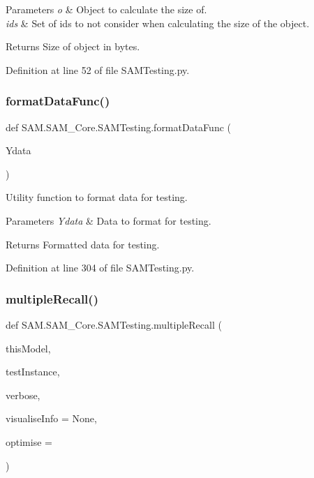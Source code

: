 \begin{DoxyParams}{Parameters}
{\em o} & Object to calculate the size of. \\
\hline
{\em ids} & Set of ids to not consider when calculating the size of the object.\\
\hline
\end{DoxyParams}
\begin{DoxyReturn}{Returns}
Size of object in bytes. 
\end{DoxyReturn}


Definition at line 52 of file S\+A\+M\+Testing.\+py.

\mbox{\label{group__icubclient__SAM__Tests_ga5edddf8683ce4a2650429c355e4dd7dd}} 
\subsubsection{\texorpdfstring{format\+Data\+Func()}{formatDataFunc()}}
{\footnotesize\ttfamily def S\+A\+M.\+S\+A\+M\+\_\+\+Core.\+S\+A\+M\+Testing.\+format\+Data\+Func (\begin{DoxyParamCaption}\item[{}]{Ydata }\end{DoxyParamCaption})}



Utility function to format data for testing. 


\begin{DoxyParams}{Parameters}
{\em Ydata} & Data to format for testing.\\
\hline
\end{DoxyParams}
\begin{DoxyReturn}{Returns}
Formatted data for testing. 
\end{DoxyReturn}


Definition at line 304 of file S\+A\+M\+Testing.\+py.

\mbox{\label{group__icubclient__SAM__Tests_ga684e61ac3df13fa4ae0d20ed03a9979f}} 
\subsubsection{\texorpdfstring{multiple\+Recall()}{multipleRecall()}}
{\footnotesize\ttfamily def S\+A\+M.\+S\+A\+M\+\_\+\+Core.\+S\+A\+M\+Testing.\+multiple\+Recall (\begin{DoxyParamCaption}\item[{}]{this\+Model,  }\item[{}]{test\+Instance,  }\item[{}]{verbose,  }\item[{}]{visualise\+Info = {\ttfamily None},  }\item[{}]{optimise = {} }\end{DoxyParamCaption})}



